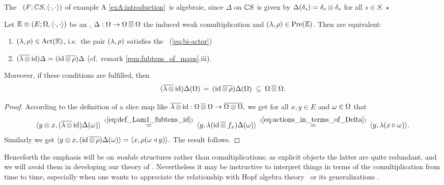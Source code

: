 \begin{exA} \label{exA:algebraic} \rm
  The \context\ $(F; \mathbb{C} S, \langle\cdot, \cdot\rangle)$ of example A \ref{exA:introduction}\
  is algebraic, since $\Delta$ on $\mathbb{C} S$ is given by
  $\Delta(\delta_s) = \delta_s \otimes \delta_s$ for all $s \in S$.
  \hfill $\star$
\end{exA}


\begin{prop}
  Let\/ $\mathbb{E} \equiv (E; \Omega, \langle\cdot, \cdot\rangle)$ be an \context, $\Delta: \Omega \rightarrow \Omega \,\overline{\otimes}\: \Omega$
  the induced weak comultiplication and $(\lambda,\rho) \in \mbox{\rm Pre}(\mathbb{E})$.
  Then are equivalent:
  \begin{enumerate}
    \item $(\lambda,\rho) \in \mbox{\rm Act}(\mathbb{E})$, i.e.\ the pair $(\lambda,\rho)$ satisfies
          the \biap\ (\ref{eq:bi-actor})
    \item $(\overline{\lambda\, \otimes}\, \mbox{\rm id}) \Delta
          =(\mbox{\rm id} \, \overline{\otimes\, \rho}) \Delta$
          (cf.\ remark \ref{rem:fubtens_of_maps}.iii).
  \end{enumerate}
  Moreover, if these conditions are fulfilled, then
  $$  (\overline{\lambda \, \otimes}\, \mbox{\rm id})   \Delta(\Omega)
       \,=\, (\mbox{\rm id} \, \overline{\otimes\, \rho}) \Delta(\Omega)
       \;\subseteq\: \Omega\,\overline{\otimes}\:\Omega. $$
\end{prop}
\begin{proof}
  According to the definition of a slice map like
  $ \overline{\lambda\,\otimes}\,\mbox{\rm id} : \Omega\,\overline{\otimes}\:\Omega \rightarrow \overline{\Omega\otimes\Omega},$
  we get for all $x,y \in E$ and $\omega \in \Omega$ that
  $$ \langle y \otimes x,(\overline{\lambda\,\otimes}\,\mbox{\rm id})\Delta(\omega) \rangle
     \:\stackrel{(\ref{eq:def_Lam1_fubtens_id})}{=}\:
              \langle y,\lambda(\mbox{\rm id} \,\overline{\otimes}\: f_x)\Delta(\omega) \rangle
     \:\stackrel{(\ref{eq:actions_in_terms_of_Delta})}{=}\:
              \langle y,\lambda(x\triangleright\omega) \rangle.  $$
  Similarly we get
  $ \langle y \otimes x,(\mbox{\rm id}\, \overline{\otimes\, \rho})\Delta(\omega) \rangle
       = \langle x,\rho(\omega \triangleleft y) \rangle. $
  The result follows.
\end{proof}
\vspace{2ex}

{\small
Henceforth the emphasis will be on {\em module\/} structures rather than comultiplications;
as explicit objects the latter are quite redundant, and we will avoid them in
developing our theory of \contexts\@. Nevertheless it may be instructive to interpret
things in terms of the comultiplication from time to time,
especially when one wants to appreciate the relationship with
Hopf algebra theory \cite{Abe,Sweedler}\ or its generalizations \cite{Fons:MHA}.}



